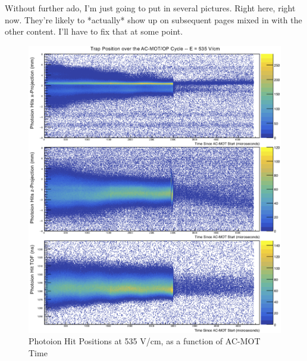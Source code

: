 Without further ado, I'm just going to put in several pictures.  Right here, right now.  They're likely to *actually* show up on subsequent pages mixed in with the other content.  I'll have to fix that at some point.
\begin{figure}[h!!t]
	\centering
	\includegraphics[width=.999\linewidth]
	{Figures/rMCP_xyz_vs_acmottime.png}
	\caption[Photoion Hit Positions at 535 V/cm, as a function of AC-MOT Time]{Photoion Hit Positions at 535 V/cm, as a function of AC-MOT Time}	
\end{figure}
